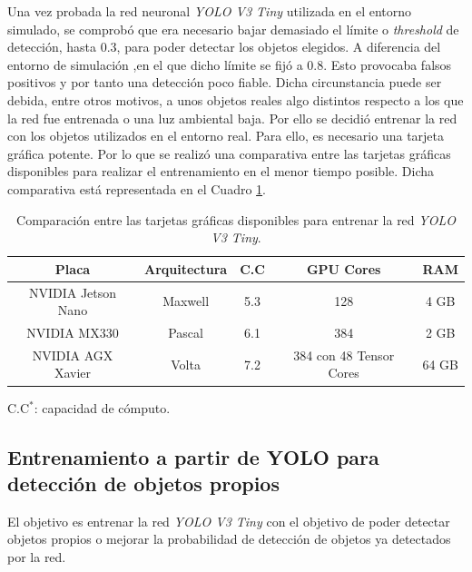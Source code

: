 Una vez probada la red neuronal \textit{YOLO V3 Tiny} utilizada en el entorno simulado, se comprobó que era necesario bajar demasiado el límite o \textit{threshold} de detección, hasta 0.3, para poder detectar los objetos elegidos. A diferencia del entorno de simulación ,en el que dicho límite se fijó a 0.8. Esto provocaba falsos positivos y por tanto una detección poco fiable. Dicha circunstancia puede ser debida, entre otros motivos, a unos objetos reales algo distintos respecto a los que la red fue entrenada o una luz ambiental baja. Por ello se decidió entrenar la red con los objetos utilizados en el entorno real. Para ello, es necesario una tarjeta gráfica potente. Por lo que se realizó una comparativa entre las tarjetas gráficas disponibles para realizar el entrenamiento en el menor tiempo posible. Dicha comparativa está representada en el Cuadro \ref{table:versusnvidia}.\\

\begin{table}[H]
	\begin{center}
		\begin{tabular}{|c|c|c|c|c|}
			\hline
			\textbf{Placa}	& \textbf{Arquitectura} & \textbf{C.C\makebox[0pt][l]{$^*$}} & \textbf{GPU Cores}				& \textbf{RAM}
			\\
			\hline
			NVIDIA Jetson Nano		& Maxwell								& 5.3														& 128												& 4 GB
			\\
			NVIDIA MX330					& Pascal								& 6.1														& 384												& 2 GB
			\\
			NVIDIA AGX Xavier			& Volta									& 7.2														& 384 con 48 Tensor Cores		& 64 GB
			\\
			\hline
		\end{tabular}
		\parbox[t]{\textwidth}{\footnotesize C.C$^*$: capacidad de cómputo.}  
		\caption{Comparación entre las tarjetas gráficas disponibles para entrenar la red \textit{YOLO V3 Tiny}.}
		\label{table:versusnvidia}
	\end{center}
\end{table}

\subsection{Entrenamiento a partir de YOLO para detección de objetos propios}
El objetivo es entrenar la red \textit{YOLO V3 Tiny} con el objetivo de poder detectar objetos propios o mejorar la probabilidad de detección de objetos ya detectados por la red.\\

